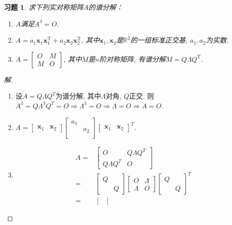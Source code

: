 \documentclass{ctexart}
\newtheorem{exercise}[thm]{习题}
\newcommand\bs[1]{\boldsymbol{ #1}}
\def\zero{O}
\DeclareMathOperator{\T}{T}
\begin{document}
\begin{exercise}
求下列实对称矩阵$A$的谱分解：
\begin{enumerate}
\item $A$满足$A^3=\zero$. 
\item $A=a_1\bs x_1\bs x_1^{\T}+a_2\bs x_2\bs x_2^{\T}$, 其中$\bs x_1,\bs x_2$是$\mathbb{R}^2$的一组标准正交基, $a_1,a_2$为实数. 
\item $A=\begin{bmatrix}\zero&M\\M&\zero\end{bmatrix}$, 其中$M$是$n$阶对称矩阵, 有谱分解$M=Q\Lambda Q^{\T}$. 
\end{enumerate}
\end{exercise}
\begin{proof}[解]
	\begin{enumerate}
		\item 设$A=Q\Lambda Q^T$为谱分解, 其中$\Lambda$对角, $Q$正交. 则$A^3=Q\Lambda^3Q^T=\zero\Rightarrow \Lambda^3=\zero\Rightarrow \Lambda=\zero\Rightarrow A=\zero$. 
			\item $A=\begin{bmatrix}
					\bs x_1 & \bs x_2
			\end{bmatrix}\begin{bmatrix}
			a_1 & \\ & a_2\\
			\end{bmatrix}\begin{bmatrix}
					\bs x_1 & \bs x_2
			\end{bmatrix}^T$. 
		\item 
        \begin{align*}
            A=&\begin{bmatrix}
				\zero & Q\Lambda Q^T\\Q\Lambda Q^T & \zero
		\end{bmatrix}\\
        =&\begin{bmatrix}
			 Q & \\ & Q
		\end{bmatrix}\begin{bmatrix}
		\zero & \Lambda \\ \Lambda & \zero
		\end{bmatrix}\begin{bmatrix}
			 Q & \\ & Q
		\end{bmatrix}^T\\
        =&\begin{bmatrix}

\end{bmatrix}
\end{align*}
\end{enumerate}
\end{proof}
\end{document}
